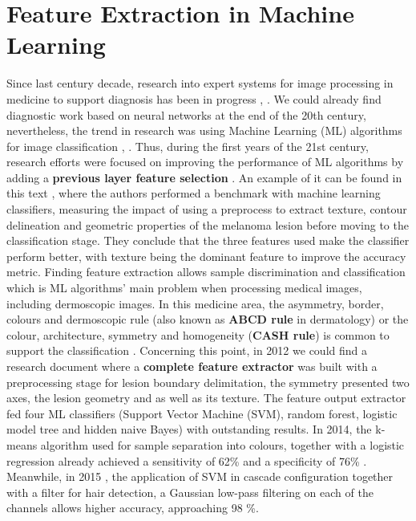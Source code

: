 \section{Feature Extraction in Machine Learning}
Since last century decade, research into expert systems for image processing in medicine to support diagnosis has been in progress  \cite{beuscart_expert_1997}, \cite{chan_expert_1996}.  We could already find diagnostic work based on neural networks \cite{wells_medical_1998} at the end of the 20th century, nevertheless, the trend in research was using Machine Learning (ML) algorithms for image classification \cite{dreiseitl_comparison_2001}, \cite{dreiseitl_classifying_2000}. Thus, during the first years of the 21st century, research efforts were focused on improving the performance of ML algorithms by adding a \textbf{previous layer feature selection} \cite{lee_machine_2009}. An example of it can be found in this text \cite{garnavi_computer-aided_2012}, where the authors performed a benchmark with machine learning classifiers, measuring the impact of using a preprocess to extract texture, contour delineation and geometric properties of the melanoma lesion before moving to the classification stage.  They conclude that the three features used make the classifier perform better, with texture being the dominant feature to improve the accuracy metric. Finding feature extraction allows sample discrimination and classification which is ML algorithms' main problem when processing medical images, including dermoscopic images. In this medicine area, the asymmetry, border, colours and dermoscopic rule (also known as \textbf{ABCD rule} in dermatology) or the colour, architecture, symmetry and homogeneity (\textbf{CASH rule}) is common to support the classification \cite{lee_machine_2009}. Concerning this point, in 2012 \cite{6263297} we could find a research document where a \textbf{complete feature extractor} was built with a preprocessing stage for lesion boundary delimitation, the symmetry presented two axes, the lesion geometry and as well as its texture.  The feature output extractor  fed four ML classifiers (Support Vector Machine (SVM), random forest, logistic model tree and hidden naive Bayes) with outstanding results. In 2014, the k-means algorithm used for sample separation into colours, together with a logistic regression already achieved a sensitivity of 62\% and a specificity of 76\% \cite{6803866}. Meanwhile, in 2015 \cite{abuzaghleh_noninvasive_2015}, the application of  SVM in cascade configuration together with a filter for hair detection, a Gaussian low-pass filtering on each of the channels allows higher accuracy, approaching 98 \%.

